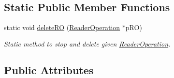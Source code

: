 \subsection*{Static Public Member Functions}
\begin{DoxyCompactItemize}
\item 
static void \hyperlink{class_e_l_f_i_n_1_1_reader_operation_a71a40f124e322dd5179079797c70bdf7}{delete\-R\-O} (\hyperlink{class_e_l_f_i_n_1_1_reader_operation}{Reader\-Operation} $\ast$p\-R\-O)
\begin{DoxyCompactList}\small\item\em Static method to stop and delete given \hyperlink{class_e_l_f_i_n_1_1_reader_operation}{Reader\-Operation}. \end{DoxyCompactList}\end{DoxyCompactItemize}
\subsection*{Public Attributes}
